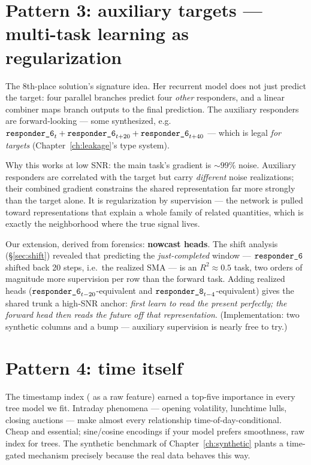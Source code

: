 \section{Pattern 3: auxiliary targets --- multi-task learning as
regularization}
\label{sec:auxtargets}

The 8th-place solution's signature idea. Her recurrent model does not just
predict the target: four parallel branches predict four \emph{other}
responders, and a linear combiner maps branch outputs to the final
prediction. The auxiliary responders are forward-looking --- some
synthesized, e.g.\ $\texttt{responder\_6}_t + \texttt{responder\_6}_{t+20} + \texttt{responder\_6}_{t+40}$ ---
which is legal \emph{for targets} (Chapter~\ref{ch:leakage}'s type system).

Why this works at low SNR: the main task's gradient is $\sim 99\%$ noise.
Auxiliary responders are correlated with the target but carry
\emph{different} noise realizations; their combined gradient constrains the
shared representation far more strongly than the target alone. It is
regularization by supervision --- the network is pulled toward
representations that explain a whole family of related quantities, which
is exactly the neighborhood where the true signal lives.

Our extension, derived from forensics: \textbf{nowcast heads}. The shift
analysis (\S\ref{sec:shift}) revealed that predicting the
\emph{just-completed} window --- $\texttt{responder\_6}$ shifted back 20 steps, i.e.\
the realized SMA --- is an $R^2 \approx 0.5$ task, two orders of magnitude
more supervision per row than the forward task. Adding realized heads
($\texttt{responder\_6}_{t-20}$-equivalent and $\texttt{responder\_8}_{t-4}$-equivalent) gives the
shared trunk a high-SNR anchor: \emph{first learn to read the present
perfectly; the forward head then reads the future off that representation}.
(Implementation: two synthetic columns and a \code{num\_aux} bump ---
auxiliary supervision is nearly free to try.)

\section{Pattern 4: time itself}

The timestamp index ( as a raw feature) earned a top-five
importance in every tree model we fit. Intraday phenomena --- opening
volatility, lunchtime lulls, closing auctions --- make almost every
relationship time-of-day-conditional. Cheap and essential; sine/cosine
encodings if your model prefers smoothness, raw index for trees. The
synthetic benchmark of Chapter~\ref{ch:synthetic} plants a
time-gated mechanism precisely because the real data behaves this way.

